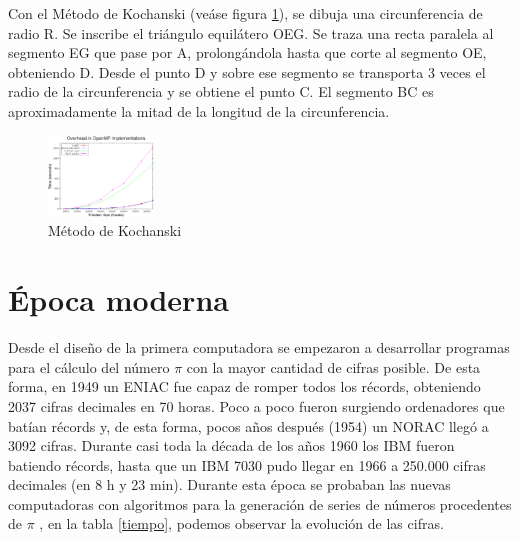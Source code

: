 \documentclass[spanish,a4paper,11pt]{article}
\newcommand{\PI}{{$\pi$ }}
\begin{document}
Con el Método de Kochanski (veáse figura \ref{Kochanski}), se dibuja una circunferencia de radio R. Se inscribe el triángulo equilátero OEG. Se traza una
recta paralela al segmento EG que pase por A, prolongándola hasta que corte al segmento OE, obteniendo D. Desde el punto D y sobre ese segmento se transporta
3 veces el radio de la circunferencia y se obtiene el punto C. El segmento BC es aproximadamente la mitad de la longitud de la circunferencia.

\begin{figure}[!th]
\begin{center}
\includegraphics[width=0.25\textwidth]{images/figura1.eps}
\caption{Método de Kochanski}
\label{Kochanski}
\end{center}
\end{figure}


\section{Época moderna}
Desde el diseño de la primera computadora se empezaron a desarrollar programas para el cálculo del número \PI con la mayor cantidad de cifras
posible. De esta forma, en 1949 un ENIAC fue capaz de romper todos los récords, obteniendo 2037 cifras decimales en 70 horas. Poco a poco fueron
surgiendo ordenadores que batían récords y, de esta forma, pocos años después (1954) un NORAC llegó a 3092 cifras. Durante casi toda la década
de los años 1960 los IBM fueron batiendo récords, hasta que un IBM 7030 pudo llegar en 1966 a 250.000 cifras decimales (en 8 h y 23 min).
Durante esta época se probaban las nuevas computadoras con algoritmos para la generación de series de números procedentes de \PI, en la tabla \ref{tiempo},
podemos observar la evolución de las cifras.
\end{document}
